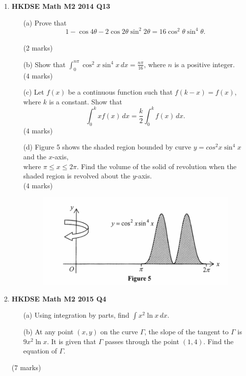 \documentclass{report}
\begin{document}
\begin{enumerate}
	\newpage

	\item \textbf{HKDSE Math M2 2014 Q13}
	\begin{enumerate}
		\item [(a)]Prove that $$1 - \cos{4\theta} - 2\cos{2\theta}\sin^2{2\theta} = 16\cos^2{\theta}\sin^4{\theta}.$$ \\(2 marks)
		\item [(b)]Show that $\displaystyle\int_{0}^{n\pi} \cos^2{x}\sin^4{x} \,dx = \displaystyle\frac{n\pi}{16}$, where $n$ is a positive integer.\\(4 marks)
		\item [(c)]Let $f(x)$ be a continuous function such that $f(k-x) = f(x)$, where $k$ is a constant. Show that $$\displaystyle\int_{0}^k xf(x)\, dx = \frac{k}{2} \int_{0}^k f(x) \,dx.$$
		(4 marks)
		\item [(d)]Figure 5 shows the shaded region bounded by curve $y = cos^2{x} \sin^4{x}$ and the $x$-axis, \\
		where $\pi \leq x \leq 2\pi$. Find the volume of the solid of revolution when the shaded region is revolved about the $y$-axis.\\
		(4 marks)
			\begin{figure}[H]
				\centering
				\includegraphics[width = .5\linewidth]{2014Figure5}
			\end{figure}
	\end{enumerate}

	\item \textbf{HKDSE Math M2 2015 Q4}
	\begin{enumerate}
		\item [(a)]Using integration by parts, find $\displaystyle\int x^2 \ln{x} \,dx $. 
		\item [(b)]At any point $(x,y)$ on the curve $\Gamma $, the slope of the tangent to $\Gamma$ is $9x^2 \ln{x}$. It is given that $\Gamma$ passes through the point $(1,4)$. Find the equation of $\Gamma$.  
	\end{enumerate}
	(7 marks)

	\newpage


\end{enumerate}
\end{document}
